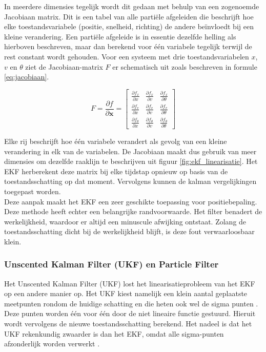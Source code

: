 In meerdere dimensies tegelijk wordt dit gedaan met behulp van een zogenoemde Jacobiaan matrix. Dit is een tabel van alle partiële afgeleiden die beschrijft hoe elke toestandsvariabele (positie, snelheid, richting) de andere beïnvloedt bij een kleine verandering. 
Een partiële afgeleide is in essentie dezelfde helling als hierboven beschreven, maar dan berekend voor één variabele tegelijk terwijl de rest constant wordt gehouden. Voor een systeem met drie toestandsvariabelen $x$, $v$ en $\theta$ ziet de Jacobiaan-matrix $F$ er schematisch uit zoals beschreven in formule \ref{eq:jacobiaan}.

\begin{equation}
F = \frac{\partial f}{\partial \mathbf{x}} =
\begin{bmatrix}
\frac{\partial f_x}{\partial x} & \frac{\partial f_x}{\partial v} & 
\frac{\partial f_x}{\partial \theta} \\[6pt]
\frac{\partial f_v}{\partial x} & \frac{\partial f_v}{\partial v} & 
\frac{\partial f_v}{\partial \theta} \\[6pt]
\frac{\partial f_\theta}{\partial x} & \frac{\partial f_\theta}{\partial v} & 
\frac{\partial f_\theta}{\partial \theta}
\end{bmatrix}
\label{eq:jacobiaan}
\end{equation}

Elke rij beschrijft hoe één variabele verandert als gevolg van een kleine verandering in elk van de variabelen. De Jacobiaan maakt dus gebruik van meer dimensies om dezelfde raaklijn te beschrijven uit figuur \ref{fig:ekf_linearisatie}. Het EKF herberekent deze matrix bij elke tijdstap opnieuw op basis van de toestandsschatting op dat moment. Vervolgens kunnen de kalman vergelijkingen toegepast worden. \\

Deze aanpak maakt het EKF een zeer geschikte toepassing voor positiebepaling. Deze methode heeft echter een belangrijke randvoorwaarde. Het filter benadert de werkelijkheid, waardoor er altijd een minuscule afwijking ontstaat. Zolang de toestandsschatting dicht bij de werkelijkheid blijft, is deze fout verwaarloosbaar klein. 


\subsubsection{Unscented Kalman Filter (UKF) en Particle Filter}
Het Unscented Kalman Filter (UKF) lost het linearisatieprobleem van het EKF 
op een andere manier op. Het UKF kiest namelijk een klein aantal geplaatste meetpunten rondom de huidige schatting en die heten ook wel de sigma punten \cite{wan_merwe_ukf}. Deze punten worden één voor één door de niet lineaire functie gestuurd. Hieruit wordt vervolgens de nieuwe toestandsschatting berekend. Het nadeel is dat het UKF rekenkundig zwaarder is dan het EKF, omdat alle sigma-punten afzonderlijk worden verwerkt \cite{bar_shalom_estimation}. \\

